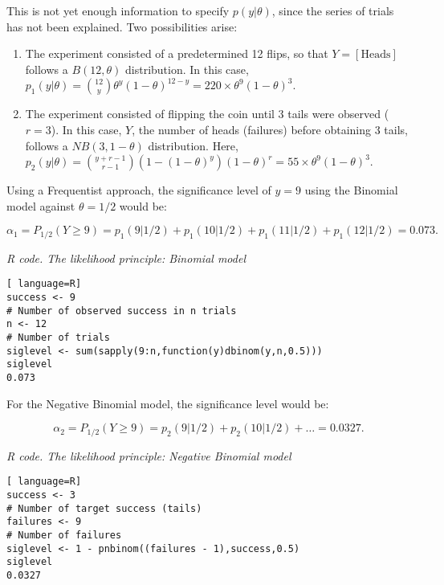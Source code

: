 This is not yet enough information to specify $p(y|\theta)$, since the series of trials has not been explained. Two possibilities arise:

\begin{enumerate}
	\item The experiment consisted of a predetermined 12 flips, so that $Y = \left[ \text{Heads} \right]$ follows a ${B}(12, \theta)$ distribution. In this case, $p_1(y|\theta) = \binom{12}{y} \theta^y (1 - \theta)^{12 - y} = 220 \times \theta^9 (1 - \theta)^3$.
	\item The experiment consisted of flipping the coin until 3 tails were observed ($r = 3$). In this case, $Y$, the number of heads (failures) before obtaining 3 tails, follows a ${NB}(3, 1 - \theta)$ distribution. Here, $p_2(y|\theta) = \binom{y + r - 1}{r - 1} (1 - (1 - \theta)^y)(1 - \theta)^r = 55 \times \theta^9 (1 - \theta)^3$.
\end{enumerate}

Using a Frequentist approach, the significance level of $y=9$ using the Binomial model against $\theta=1/2$ would be:

\begin{equation*}
	\alpha_1=P_{1/2}(Y\geq
	9)=p_1(9|1/2)+p_1(10|1/2)+p_1(11|1/2)+p_1(12|1/2)=0.073.
\end{equation*}

\begin{tcolorbox}[enhanced,width=4.67in,center upper,
	fontupper=\large\bfseries,drop shadow southwest,sharp corners]
	\textit{R code. The likelihood principle: Binomial model}
\begin{VF}
\begin{lstlisting}[ language=R]
success <- 9 
# Number of observed success in n trials
n <- 12 
# Number of trials
siglevel <- sum(sapply(9:n,function(y)dbinom(y,n,0.5)))
siglevel
0.073
\end{lstlisting}
\end{VF}
\end{tcolorbox}

For the Negative Binomial model, the significance level would be:

\begin{equation*}
	\alpha_2=P_{1/2}(Y\geq 9)=p_2(9|1/2)+p_2(10|1/2)+\ldots=0.0327.
\end{equation*}

\begin{tcolorbox}[enhanced,width=4.67in,center upper,
	fontupper=\large\bfseries,drop shadow southwest,sharp corners]
	\textit{R code. The likelihood principle: Negative Binomial model}
\begin{VF}
\begin{lstlisting}[ language=R]
success <- 3 
# Number of target success (tails)
failures <- 9 
# Number of failures
siglevel <- 1 - pnbinom((failures - 1),success,0.5)
siglevel
0.0327
\end{lstlisting}
\end{VF}
\end{tcolorbox}

